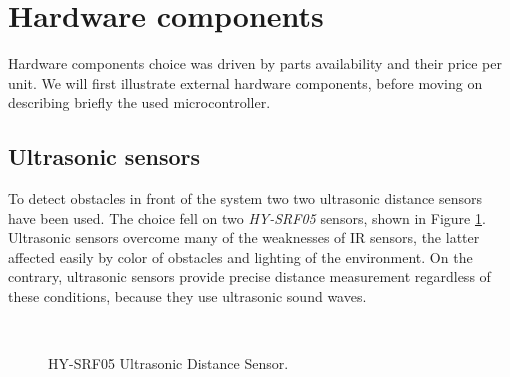 \section{Hardware components}

Hardware components choice was driven by parts availability and their price per unit. We will first illustrate external hardware components, before moving on describing briefly the used microcontroller.

\subsection{Ultrasonic sensors}

To detect obstacles in front of the system two two ultrasonic distance sensors have been used. The choice fell on two \textit{HY-SRF05} sensors, shown in Figure \ref{fig:sensor}. Ultrasonic sensors overcome many of the weaknesses of IR sensors, the latter affected easily by color of obstacles and lighting of the environment. On the contrary, ultrasonic sensors provide precise distance measurement regardless of these conditions, because they use ultrasonic sound waves.

\begin{figure}[htp]
\centering
\hspace*{\fill}
\hfill
{}
\hspace*{\fill}\\
\caption{HY-SRF05 Ultrasonic Distance Sensor.}
\label{fig:sensor}
\end{figure}


